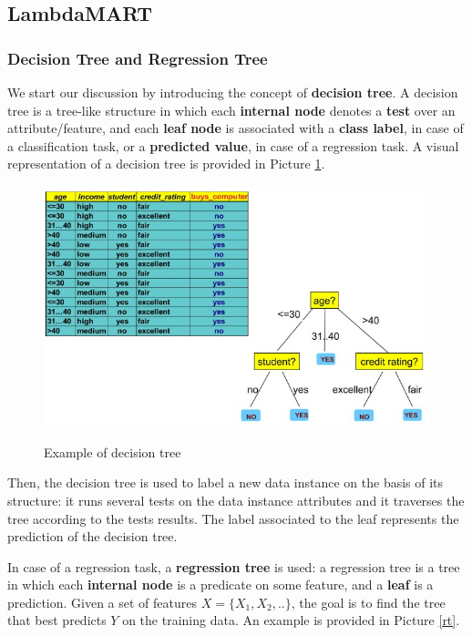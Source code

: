 \subsection{LambdaMART}

\subsubsection{Decision Tree and Regression Tree}
We start our discussion by introducing the concept of \textbf{decision tree}. A decision tree is a tree-like structure in which each \textbf{internal node} denotes a \textbf{test} over an attribute/feature, and each \textbf{leaf node} is associated with a \textbf{class label}, in case of a classification task, or a \textbf{predicted value}, in case of a regression task. A visual representation of a decision tree is provided in Picture \ref{dt}.

\begin{figure}[h!]
		\centering
        \includegraphics[scale = 1.8]{img/decision tree.jpg}
		\label{dt}
        \caption{Example of decision tree}
\end{figure}

Then, the decision tree is used to label a new data instance on the basis of its structure: it runs several tests on the data instance attributes and it traverses the tree according to the tests results. The label associated to the leaf represents the prediction of the decision tree.

In case of a regression task, a \textbf{regression tree} is used: a regression tree is a tree in which each \textbf{internal node} is a predicate on some feature, and a \textbf{leaf} is a prediction. Given a set of features $X = \{ X_1, X_2, .. \}$, the goal is to find the tree that best predicts $Y$ on the training data. An example is provided in Picture \ref{rt}.

